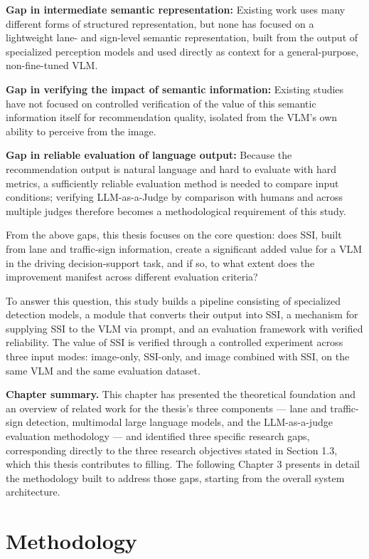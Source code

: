 \documentclass[12pt,a4paper]{report}
\begin{document}
\textbf{Gap in intermediate semantic representation:} Existing work uses many different forms of structured representation, but none has focused on a lightweight lane- and sign-level semantic representation, built from the output of specialized perception models and used directly as context for a general-purpose, non-fine-tuned VLM.

\textbf{Gap in verifying the impact of semantic information:} Existing studies have not focused on controlled verification of the value of this semantic information itself for recommendation quality, isolated from the VLM's own ability to perceive from the image.

\textbf{Gap in reliable evaluation of language output:} Because the recommendation output is natural language and hard to evaluate with hard metrics, a sufficiently reliable evaluation method is needed to compare input conditions; verifying LLM-as-a-Judge by comparison with humans and across multiple judges therefore becomes a methodological requirement of this study.

From the above gaps, this thesis focuses on the core question: does SSI, built from lane and traffic-sign information, create a significant added value for a VLM in the driving decision-support task, and if so, to what extent does the improvement manifest across different evaluation criteria?

To answer this question, this study builds a pipeline consisting of specialized detection models, a module that converts their output into SSI, a mechanism for supplying SSI to the VLM via prompt, and an evaluation framework with verified reliability. The value of SSI is verified through a controlled experiment across three input modes: image-only, SSI-only, and image combined with SSI, on the same VLM and the same evaluation dataset.

\textbf{Chapter summary.} This chapter has presented the theoretical foundation and an overview of related work for the thesis's three components --- lane and traffic-sign detection, multimodal large language models, and the LLM-as-a-judge evaluation methodology --- and identified three specific research gaps, corresponding directly to the three research objectives stated in Section 1.3, which this thesis contributes to filling. The following Chapter 3 presents in detail the methodology built to address those gaps, starting from the overall system architecture.

\chapter{Methodology}
\end{document}
